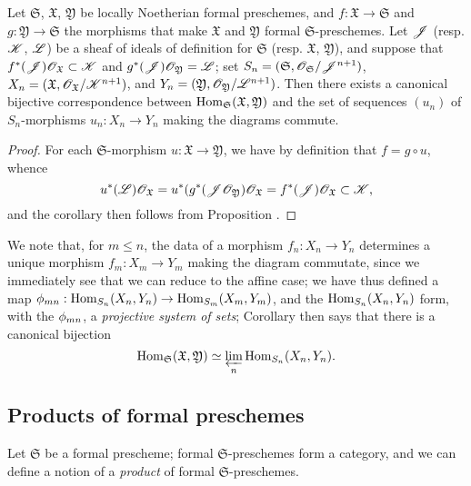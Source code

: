 \begin{corollary}[10.6.11]
\label{I.10.6.11}
Let $\mathfrak{S}$, $\mathfrak{X}$, $\mathfrak{Y}$ be locally Noetherian formal preschemes, and $f:\mathfrak{X}\to\mathfrak{S}$ and $g:\mathfrak{Y}\to\mathfrak{S}$ the morphisms that make $\mathfrak{X}$ and $\mathfrak{Y}$ formal $\mathfrak{S}$-preschemes.
Let $\mathscr{J}$ (resp. $\mathscr{K}$, $\mathscr{L}$) be a sheaf of ideals of definition for $\mathfrak{S}$ (resp. $\mathfrak{X}$, $\mathfrak{Y}$), and suppose that $f^*(\mathscr{J})\mathscr{O}_\mathfrak{X}\subset\mathscr{K}$ and $g^*(\mathscr{J})\mathscr{O}_\mathfrak{Y}=\mathscr{L}$; set $S_n=(\mathfrak{S},\mathscr{O}_\mathfrak{S}/\mathscr{J}^{n+1})$, $X_n=(\mathfrak{X},\mathscr{O}_\mathfrak{X}/\mathscr{K}^{n+1})$, and $Y_n=(\mathfrak{Y},\mathscr{O}_\mathfrak{Y}/\mathscr{L}^{n+1})$.
Then there exists a canonical bijective correspondence
between $\operatorname{Hom}_\mathfrak{S}(\mathfrak{X},\mathfrak{Y})$ and the set of sequences $(u_n)$ of $S_n$-morphisms $u_n:X_n\to Y_n$ making the diagrams  commute.
\end{corollary}

\begin{proof}
For each $\mathfrak{S}$-morphism $u:\mathfrak{X}\to\mathfrak{Y}$, we have by definition that $f=g\circ u$, whence
\[
  u^*(\mathscr{L})\mathscr{O}_\mathfrak{X}=u^*(g^*(\mathscr{J}\mathscr{O}_\mathfrak{Y})\mathscr{O}_\mathfrak{X}=f^*(\mathscr{J})\mathscr{O}_\mathfrak{X}\subset\mathscr{K},
\]
and the corollary then follows from Proposition .
\end{proof}

We note that, for $m\leq n$, the data of a morphism $f_n:X_n\to Y_n$ determines a unique morphism $f_m:X_m\to Y_m$ making the diagram  commutate, since we immediately see that we can reduce to the affine case; we have thus defined a map $\vphi_{mn}:\Hom_{S_n}(X_n,Y_n)\to\Hom_{S_m}(X_m,Y_m)$, and the $\operatorname{Hom}_{S_n}(X_n,Y_n)$ form, with the $\phi_{mn}$, a \emph{projective system of sets}; Corollary  then says that there is a canonical bijection
\[
  \operatorname{Hom}_\mathfrak{S}(\mathfrak{X},\mathfrak{Y})\simeq\varprojlim_n\operatorname{Hom}_{S_n}(X_n,Y_n).
\]

\subsection{Products of formal preschemes}
\label{subsection:I.10.7}

\begin{env}[10.7.1]
\label{I.10.7.1}
Let $\mathfrak{S}$ be a formal prescheme; formal $\mathfrak{S}$-preschemes form a category, and we can define a notion of a \emph{product} of formal $\mathfrak{S}$-preschemes.
\end{env}

